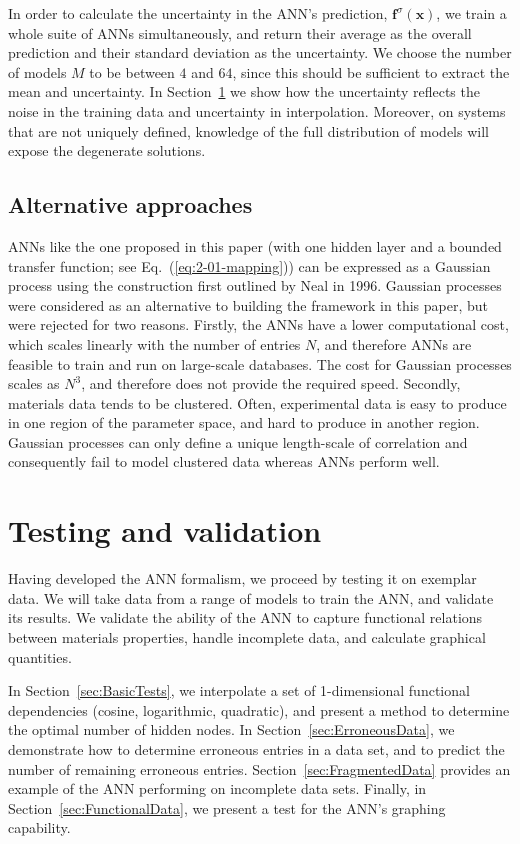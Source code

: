 \documentclass[review]{elsarticle}
\newcommand{\secref}[1]{Section~\ref{#1}}
\newcommand{\eqnref}[1]{Eq.~(\ref{#1})}
\newcommand{\vx}{\textbf{x}}
\newcommand{\vf}{\textbf{f}}
\begin{document}
In order to calculate the uncertainty in the ANN's prediction,
$\vf^\sigma (\vx)$, we train a whole suite of ANNs simultaneously, and
return their average as the overall prediction and their standard deviation
as the uncertainty\cite{Steck03}. We choose the number of models $M$ to be
between $4$ and $64$, since this should be sufficient to extract the mean
and uncertainty. In \secref{sec:Testing} we show how the uncertainty
reflects the noise in the training data and uncertainty in
interpolation. Moreover, on systems that are not uniquely defined, knowledge
of the full distribution of models will expose the degenerate solutions.

\subsection{Alternative approaches} \label{sec:comparetoGP}

ANNs like the one proposed in this paper (with one hidden layer and a
bounded transfer function; see \eqnref{eq:2-01-mapping}) can be expressed as
a Gaussian process using the construction first outlined by Neal
\cite{NEAL96} in 1996. Gaussian processes were considered as an alternative
to building the framework in this paper, but were rejected for two
reasons. Firstly, the ANNs have a lower computational cost, which scales
linearly with the number of entries $N$, and therefore ANNs are feasible to
train and run on large-scale databases. The cost for Gaussian processes
scales as $N^3$, and therefore does not provide the required
speed. Secondly, materials data tends to be clustered. Often, experimental
data is easy to produce in one region of the parameter space, and hard to
produce in another region. Gaussian processes can only define a unique
length-scale of correlation and consequently fail to model clustered data
whereas ANNs perform well.

\section{Testing and validation}\label{sec:Testing}

Having developed the ANN formalism, we proceed by testing it on exemplar
data. We will take data from a range of models to train the ANN, and
validate its results. We validate the ability of the ANN to capture
functional relations between materials properties, handle incomplete data,
and calculate graphical quantities.

In \secref{sec:BasicTests}, we interpolate a set of 1-dimensional functional
dependencies (cosine, logarithmic, quadratic), and present a method to
determine the optimal number of hidden nodes. In \secref{sec:ErroneousData},
we demonstrate how to determine erroneous entries in a data set, and to
predict the number of remaining erroneous
entries. \secref{sec:FragmentedData} provides an example of the ANN
performing on incomplete data sets. Finally, in \secref{sec:FunctionalData},
we present a test for the ANN's graphing capability.
\end{document}
